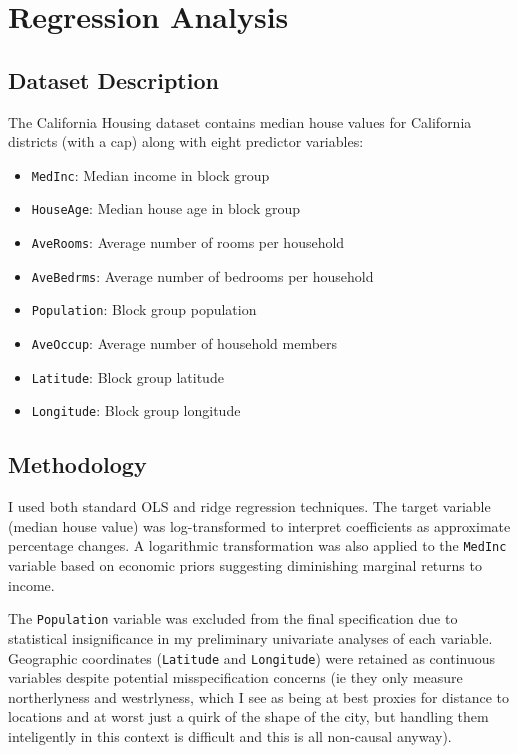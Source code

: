 \documentclass[letterpaper, 11pt]{amsart}
\begin{document}
\section{Regression Analysis}

\subsection{Dataset Description}
The California Housing dataset contains median house values for California districts (with a cap) along with eight predictor variables:
\begin{itemize}
    \item \texttt{MedInc}: Median income in block group
    \item \texttt{HouseAge}: Median house age in block group
    \item \texttt{AveRooms}: Average number of rooms per household
    \item \texttt{AveBedrms}: Average number of bedrooms per household
    \item \texttt{Population}: Block group population
    \item \texttt{AveOccup}: Average number of household members
    \item \texttt{Latitude}: Block group latitude
    \item \texttt{Longitude}: Block group longitude
\end{itemize}

\subsection{Methodology}
I used both standard OLS and ridge regression techniques. The target variable (median house value) was log-transformed to interpret coefficients as approximate percentage changes. A logarithmic transformation was also applied to the \texttt{MedInc} variable based on economic priors suggesting diminishing marginal returns to income.

The \texttt{Population} variable was excluded from the final specification due to statistical insignificance in my preliminary univariate analyses of each variable. Geographic coordinates (\texttt{Latitude} and \texttt{Longitude}) were retained as continuous variables despite potential misspecification concerns (ie they only measure northerlyness and westrlyness, which I see as being at best proxies for distance to locations and at worst just a quirk of the shape of the city, but handling them inteligently in this context is difficult and this is all non-causal anyway).
\end{document}
